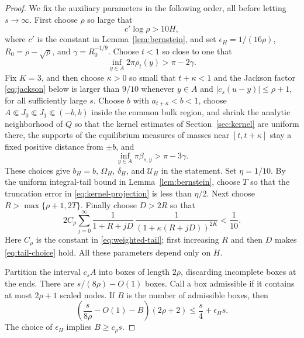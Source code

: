 \documentclass[11pt]{article}
\theoremstyle{definition}
\numberwithin{equation}{section}
\begin{document}
\begin{proof}
We fix the auxiliary parameters in the following order, all before
letting \(s\to\infty\). First choose \(\rho\) so large that
\[
 c'\log\rho>10H,
\]
where \(c'\) is the constant in Lemma~\ref{lem:bernstein}, and set
\(\epsilon_H=1/(16\rho)\), \(R_0=\rho-\sqrt\rho\), and
\(\gamma=R_0^{-1/9}\). Choose \(t<1\)
so close to one that
\[
 \inf_{y\in A}2\pi\rho_t(y)>\pi-2\gamma.
\]
Fix \(K=3\), and then choose \(\kappa>0\) so small that
\(t+\kappa<1\) and the Jackson factor \eqref{eq:jackson} below is
larger than \(9/10\) whenever \(y\in A\) and
\(|c_s(u-y)|\le\rho+1\), for all sufficiently large \(s\). Choose
\(b\) with \(a_{t+\kappa}<b<1\), choose
\(A\Subset J_0\Subset J_1\Subset(-b,b)\) inside the common bulk
region, and shrink the analytic neighborhood of \(Q\) so that the
kernel estimates of Section~\ref{sec:kernel} are uniform there, the
supports of the equilibrium measures of masses near
\([t,t+\kappa]\) stay a fixed positive distance from \(\pm b\), and
\begin{equation}\label{eq:bandwidth-margin}
 \inf_{y\in A}\pi\beta_{s,y}>\pi-3\gamma.
\end{equation}
These choices give \(b_H=b\), \(\Omega_H\), \(\delta_H\), and
\(\mathcal U_H\) in the statement.
Set \(\eta=1/10\). By the uniform integral-tail bound in
Lemma~\ref{lem:bernstein}, choose \(T\) so that the truncation error
in \eqref{eq:kernel-projection} is less than \(\eta/2\). Next choose
\(R>\max\{\rho+1,2T\}\). Finally choose \(D>2R\) so that
\begin{equation}\label{eq:tail-choice}
 2C_\rho\sum_{j=0}^{\infty}
 \frac{1}{1+R+jD}\,
 \frac{1}{(1+\kappa(R+jD))^{2K}}<\frac1{10}.
\end{equation}
Here \(C_\rho\) is the constant in \eqref{eq:weighted-tail}; first
increasing \(R\) and then \(D\) makes \eqref{eq:tail-choice} hold.
All these parameters depend only on \(H\).

Partition the interval \(c_sA\) into boxes of length \(2\rho\),
discarding incomplete boxes at the ends.
There are \(s/(8\rho)-O(1)\) boxes.
Call a box admissible if it contains at most \(2\rho+1\) scaled nodes.
If \(B\) is the number of admissible boxes, then
\[
 \left(\frac{s}{8\rho}-O(1)-B\right)(2\rho+2)
 \le \frac{s}{4}+\epsilon_H s.
\]
The choice of \(\epsilon_H\) implies \(B\ge c_\rho s\).


\end{proof}
\end{document}
